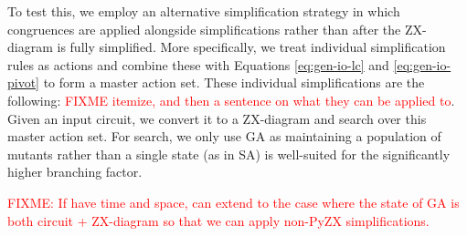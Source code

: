 To test this, we employ an alternative simplification strategy in which congruences are applied alongside simplifications rather than after the ZX-diagram is fully simplified.
More specifically, we treat individual simplification rules as actions and combine these with Equations \ref{eq:gen-io-lc} and \ref{eq:gen-io-pivot} to form a master action set.
These individual simplifications are the following: \textcolor{red}{FIXME itemize, and then a sentence on what they can be applied to}.
Given an input circuit, we convert it to a ZX-diagram and search over this master action set.
For search, we only use GA as maintaining a population of mutants rather than a single state (as in SA) is well-suited for the significantly higher branching factor.

\textcolor{red}{FIXME: If have time and space, can extend to the case where the state of GA is both circuit + ZX-diagram so that we can apply non-PyZX simplifications.}









